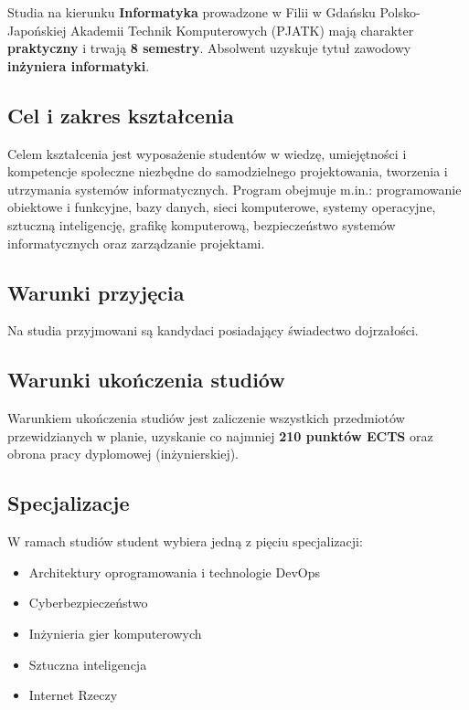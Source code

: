 \documentclass[12pt,a4paper]{article}
\begin{document}
\newpage

Studia na kierunku \textbf{Informatyka} prowadzone w Filii w Gdańsku Polsko-Japońskiej Akademii Technik Komputerowych (PJATK) mają charakter \textbf{praktyczny} i trwają \textbf{8 semestry}. Absolwent uzyskuje tytuł zawodowy \textbf{inżyniera informatyki}.

\subsection{Cel i zakres kształcenia}

Celem kształcenia jest wyposażenie studentów w wiedzę, umiejętności i kompetencje społeczne niezbędne do samodzielnego projektowania, tworzenia i utrzymania systemów informatycznych. Program obejmuje m.in.: programowanie obiektowe i funkcyjne, bazy danych, sieci komputerowe, systemy operacyjne, sztuczną inteligencję, grafikę komputerową, bezpieczeństwo systemów informatycznych oraz zarządzanie projektami.

\subsection{Warunki przyjęcia}

Na studia przyjmowani są kandydaci posiadający świadectwo dojrzałości.

\subsection{Warunki ukończenia studiów}

Warunkiem ukończenia studiów jest zaliczenie wszystkich przedmiotów przewidzianych w planie, uzyskanie co najmniej \textbf{210 punktów ECTS} oraz obrona pracy dyplomowej (inżynierskiej).

\subsection{Specjalizacje}

W ramach studiów student wybiera jedną z pięciu specjalizacji:
\begin{itemize}
  \item Architektury oprogramowania i technologie DevOps
  \item Cyberbezpieczeństwo
  \item Inżynieria gier komputerowych
  \item Sztuczna inteligencja
  \item Internet Rzeczy
\end{itemize}
\end{document}
